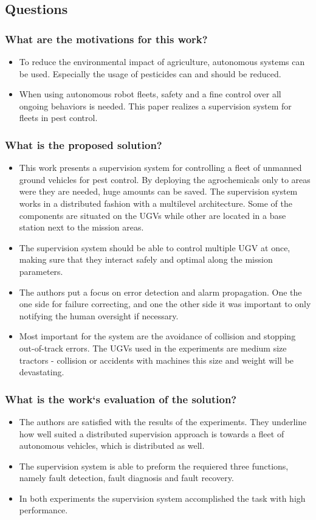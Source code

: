 \subsection*{Questions}
\subsubsection*{What are the motivations for this work?}
\begin{itemize}
    \item To reduce the environmental impact of agriculture, autonomous systems can be used. Especially the usage of pesticides can and should be reduced. 
    \item When using autonomous robot fleets, safety and a fine control over all ongoing behaviors is needed. This paper realizes a supervision system for fleets in pest control.
\end{itemize}
\subsubsection*{What is the proposed solution?}
\begin{itemize}
    \item  This work presents a supervision system for controlling a fleet of unmanned ground vehicles for pest control. By deploying the agrochemicals only to areas were they are needed, huge amounts can be saved. The supervision system works in a distributed fashion with a multilevel architecture. Some of the components are situated on the UGVs while other are located in a base station next to the mission areas.
    \item The supervision system should be able to control multiple UGV at once, making sure that they interact safely and optimal along the mission parameters.  
    \item The authors put a focus on error detection and alarm propagation. One the one side for failure correcting, and one the other side it was important to only notifying the human oversight if necessary. 
    \item Most important for the system are the avoidance of collision and stopping out-of-track errors. The UGVs used in the experiments are medium size tractors - collision or accidents with machines this size and weight will be devastating.
\end{itemize}
\subsubsection*{What is the work`s evaluation of the solution?}
\begin{itemize}
    \item The authors are satisfied with the results of the experiments. They underline how well suited a distributed supervision approach is towards a fleet of autonomous vehicles, which is distributed as well.
    \item The supervision system is able to preform the requiered three functions, namely fault detection, fault diagnosis and fault recovery.
    \item In both experiments the supervision system accomplished the task with high performance.
\end{itemize}
